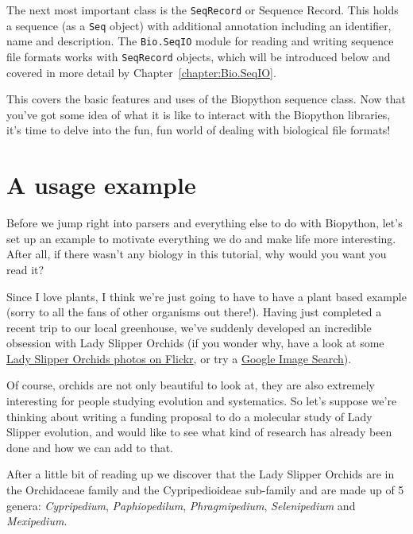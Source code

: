 \documentclass{report}
\begin{document}
The next most important class is the \verb|SeqRecord| or Sequence Record.  This holds a sequence (as a \verb|Seq| object) with additional annotation including an identifier, name and description.  The \verb|Bio.SeqIO| module for reading and writing sequence file formats works with \verb|SeqRecord| objects, which will be introduced below and covered in more detail by Chapter~\ref{chapter:Bio.SeqIO}.

This covers the basic features and uses of the Biopython sequence class.
Now that you've got some idea of what it is like to interact with the Biopython libraries, it's time to delve into the fun, fun world of dealing with biological file formats!

\section{A usage example}
\label{sec:orchids}

Before we jump right into parsers and everything else to do with Biopython, let's set up an example to motivate everything we do and make life more interesting. After all, if there wasn't any biology in this tutorial, why would you want you read it?

Since I love plants, I think we're just going to have to have a plant based example (sorry to all the fans of other organisms out there!).  Having just completed a recent trip to our local greenhouse, we've suddenly developed an incredible obsession with Lady Slipper Orchids (if you wonder why, have a look at some \href{http://www.flickr.com/search/?q=lady+slipper+orchid&s=int&z=t}{Lady Slipper Orchids photos on Flickr}, or try a \href{http://images.google.com/images?q=lady%20slipper%20orchid}{Google Image Search}).

Of course, orchids are not only beautiful to look at, they are also extremely interesting for people studying evolution and systematics. So let's suppose we're thinking about writing a funding proposal to do a molecular study of Lady Slipper evolution, and would like to see what kind of research has already been done and how we can add to that.


After a little bit of reading up we discover that the Lady Slipper Orchids are in the Orchidaceae family and the Cypripedioideae sub-family and are made up of 5 genera:  \emph{Cypripedium}, \emph{Paphiopedilum}, \emph{Phragmipedium}, \emph{Selenipedium} and \emph{Mexipedium}.
\end{document}
